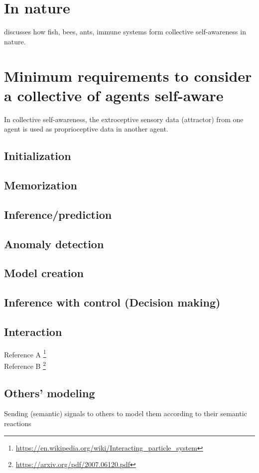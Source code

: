 \documentclass{article}
\begin{document}
	\section{In nature}
	\citet{mitchell-2005-self-awareness-and-control-in-decentralized-systems} discusses how fish, bees, ants, immune systems form collective self-awareness in nature.
	
	\section{Minimum requirements to consider a collective of agents self-aware}
		In collective self-awareness, the extroceptive sensory data (attractor) from one agent is used as proprioceptive data in another agent. 
		\subsection{Initialization}
		\subsection{Memorization}
		\subsection{Inference/prediction}
		\subsection{Anomaly detection}
		\subsection{Model creation}
		\subsection{Inference with control (Decision making)}
		\subsection{Interaction}
			Reference A \footnote{\url{https://en.wikipedia.org/wiki/Interacting_particle_system}}
			\\
			Reference B \footnote{\url{https://arxiv.org/pdf/2007.06120.pdf}}
			\subsection{Others' modeling}
			Sending (semantic) signals to others to model them according to their semantic reactions
\end{document}

